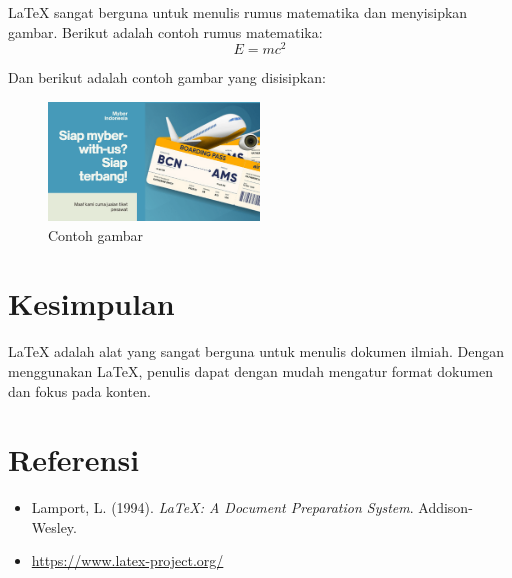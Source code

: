 \documentclass[a4paper,12pt]{article}
\begin{document}
LaTeX sangat berguna untuk menulis rumus matematika dan menyisipkan gambar. Berikut adalah contoh rumus matematika:
\begin{equation}
E = mc^2
\end{equation}

Dan berikut adalah contoh gambar yang disisipkan:
\begin{figure}[h]
    \centering
    \includegraphics[width=0.5\textwidth]{../assets/banner.png}
    \caption{Contoh gambar}
    \label{fig:example}
\end{figure}



\section{Kesimpulan}
LaTeX adalah alat yang sangat berguna untuk menulis dokumen ilmiah. Dengan menggunakan LaTeX, penulis dapat dengan mudah mengatur format dokumen dan fokus pada konten.

\section*{Referensi}
\begin{itemize}
    \item Lamport, L. (1994). \textit{LaTeX: A Document Preparation System}. Addison-Wesley.
    \item \url{https://www.latex-project.org/}
\end{itemize}
\end{document}
